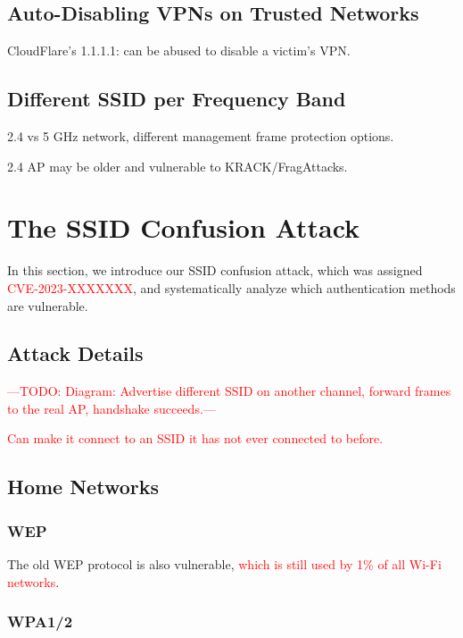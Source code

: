 \documentclass[sigconf,review]{acmart}
\newcommand{\wifi}{\mbox{Wi-Fi}}
\DeclareRobustCommand{\red}[1]{\textcolor{red}{#1}}
\begin{document}
\subsection{Auto-Disabling VPNs on Trusted Networks}

CloudFlare's 1.1.1.1: can be abused to disable a victim's VPN.

\subsection{Different SSID per Frequency Band}

2.4 vs 5 GHz network, different management frame protection options.

2.4 AP may be older and vulnerable to KRACK/FragAttacks.

\section{The SSID Confusion Attack}
\label{sec:attack}

In this section, we introduce our SSID confusion attack, which was assigned \red{CVE-2023-XXXXXXX}, and systematically analyze which authentication methods are vulnerable.

\subsection{Attack Details}



\red{---TODO: Diagram: Advertise different SSID on another channel, forward frames to the real AP, handshake succeeds.---}

\red{Can make it connect to an SSID it has not ever connected to before.}



\subsection{Home Networks}

\subsubsection{WEP}
The old WEP protocol is also vulnerable, \red{which is still used by 1\% of all \wifi{} networks}.

\subsubsection{WPA1/2}
\end{document}

